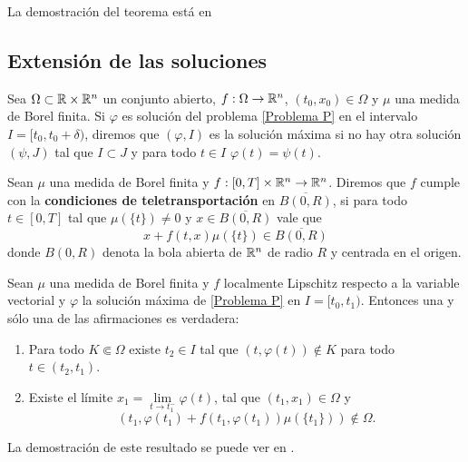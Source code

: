  La demostración del teorema está en \cite[Teorema 4.1]{P.Mazzone}
 
 \subsection{Extensión de las soluciones}
 \begin{defi} 
 	Sea $\Omega\subset\mathbb{R}\times\mathbb{R}^n$ un conjunto abierto, $f:\Omega\to\mathbb{R}^n$, $(t_0,x_0)\in\Omega$ y $\mu$ una medida de Borel finita. Si $\varphi$ es solución del problema \eqref{Problema P} en el intervalo $I=[t_0,t_0+\delta)$, diremos que $(\varphi,I)$ es la solución máxima si no hay otra solución $(\psi,J)$ tal que $I\subset J$ y para todo $t\in I$ $\varphi(t)=\psi(t)$.
 \end{defi}

 \begin{defi} 
 	Sean $\mu$ una medida de Borel finita y  $f:[0,T]\times\mathbb{R}^n\to\mathbb{R}^n$. Diremos que $f$ cumple con la \textbf{condiciones de teletransportación} en  $\overline{B(0,R)}$, si  para todo $t\in[0,T]$ tal que $\mu(\{t\})\neq0$ y $x\in\overline{ B(0,R)}$ vale que 
 	\begin{equation*}
 		x+f(t, x)\mu(\{t\}) \in \overline{B(0,R)} \label{fun-tele}
 	\end{equation*}
 	donde $B(0,R)$ denota la bola abierta de $\mathbb{R}^n$ de radio $R$ y centrada en el origen.
 \end{defi}

\begin{thm}	\label{th:extensión}
	Sean $\mu$ una medida de Borel finita y $f$ localmente Lipschitz respecto a la variable vectorial y $\varphi$ la solución máxima de \eqref{Problema P} en $I=[t_0,t_1)$. Entonces una y sólo una de las afirmaciones es verdadera: 
	\begin{enumerate}[label=\upshape(\Roman*)]
		\item  Para todo $K\Subset\Omega$ existe $t_2\in I$ tal que $(t,\varphi(t))\notin K$ para todo $t\in(t_2,t_1)$.
		\item Existe el límite $x_1=\lim\limits_{t\to t_1^-}\varphi(t)$, tal que  $(t_1,x_1)\in\Omega$ y 
		$$\left( t_1 ,\varphi(t_1)+f(t_1,\varphi(t_1))\mu(\{t_1\})\right) \notin \Omega.$$
	
	\end{enumerate}
\end{thm}
La demostración de este resultado se puede ver en \cite[Teorema 5.5]{P.Mazzone}.


















